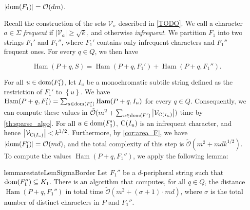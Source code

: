 \documentclass[twoside,leqno]{article}
\let\Cref\cref
\renewcommand{\O}{\mathcal{O}}
\newcommand{\tO}{\tilde{\mathcal{O}}}
\newcommand{\V}{\mathcal{V}}
\newcommand{\set}[1]{\left\lbrace #1 \right\rbrace}
\DeclareMathOperator*{\Ham}{Ham}
\newcommand{\absolute}[1]{\left\lvert#1\right\rvert}
\newcommand{\jonas}[2][]{\todo[color=green!40, #1]{\textbf{J:} #2}}
\begin{document}
\begin{corollary}\label{cor:area_F}
$\absolute{\d{F_1}} = \O(dm)$. 
\end{corollary}

Recall the construction of the sets $\V_\sigma$ described in \Cref{TODO}\jonas{TODO}. We call a character $a \in \Sigma$ \emph{frequent} if $\absolute{\V_a} \ge \sqrt{k}$, and otherwise \emph{infrequent}. We partition $F_1$ into two strings $F_1'$ and $F_1''$, where $F_1'$ contains only infrequent characters and $F_1''$ frequent ones. For every $q \in Q$, we then have 

\[\Ham(P + q, S) = \Ham(P + q, F_1') + \Ham(P + q, F_1'').\]

For all $u \in \operatorname*{dom}(F_1')$, let $I_u$ be a monochromatic subtile string defined as the restriction of $F_1'$ to $\set{u}$. 
We have $\Ham(P + q, F_1') = \sum_{u \in \d{F_1'}} \Ham(P + q, I_u)$ for every $q \in Q$. 
Consequently, we can compute these values in $\tO(m^2 + \sum_{u \in \d{F'}} \absolute{\V_{\getchar{I_u}}})$ time by \cref{th:sparse_algo}. 
For all $u \in \operatorname*{dom}(F_1')$, $\operatorname*{C}(I_u)$ is an infrequent character, and hence $\absolute{\V_{\getchar{I_u}}} < k^{1/2}$. 
Furthermore, by \cref{cor:area_F}, we have $\absolute{\d{F_1'}} = \O(md)$, and the total complexity of this step is $\tO(m^2 + mdk^{1/2})$. 
To compute the values $\Ham(P + q, F_1'')$, we apply the following lemma:

\begin{restatable}{lemma}{restateLemSigmaBorder}\label{lm:sigma_border}
Let $F_1''$ be a $d$-peripheral string such that $\operatorname*{dom}(F_1'') \subseteq K_1$. There is an algorithm that computes, for all $q \in Q$, the distance $\Ham(P + q, F_1'')$ in total time $\tO(m^2 + (\sigma+1) \cdot md)$, where $\sigma$ is the total number of distinct characters in $P$ and $F_1''$.
\end{restatable}
\end{document}
